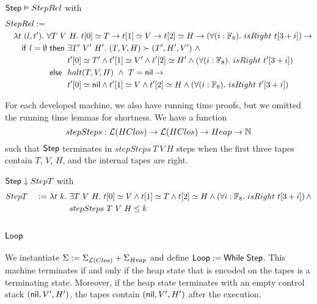 \begin{lemma}
  \label{lem:Step_Realise}
  $\mathsf{Step} \mathrel{\vDash} StepRel$ with
  \begin{alignat*}{1}
    & StepRel := \\
    &\quad \lambda t~(l, t').~\forall T~V~H.~ t[0] \simeq T \rightarrow t[1] \simeq V \rightarrow t[2] \simeq H \rightarrow \left(\forall (i:\Fin_8).~isRight~t[3+i]\right) \rightarrow \\
    &\qquad \MS{if}~l=\None~\pthen~\exists T'~V'~H'.~(T,V,H) \red (T',H',V') ~\land~ \\
    &\qquad \phantom{\MS{if}~l=\None~\pthen}~ t'[0] \simeq T' \land t'[1] \simeq V' \land t'[2] \simeq H' \land \left(\forall (i:\Fin_8).~isRight~t'[3+i]\right) \\
    &\qquad \phantom{\MS{if}~l=\None}~\pelse~ halt(T,V,H) ~\land~ T=\nil \rightarrow \\
    &\qquad \phantom{\MS{if}~l=\None~\pelse}~t'[0] \simeq \nil \land t'[1] \simeq V \land t'[2] \simeq H \land \left(\forall (i:\Fin_8).~isRight~t'[3+i]\right)
  \end{alignat*}
\end{lemma}

For each developed machine, we also have running time proofs, but we omitted the running time lemmas for shortness.  We have a function
\[
  stepSteps : \mathcal{L}(HClos) \rightarrow \mathcal{L}(HClos) \rightarrow Heap \rightarrow \mathbb{N}
\]
such that $\mathsf{Step}$ terminates in $stepSteps~T~V~H$ steps when the first three tapes contain $T$, $V$, $H$, and the internal tapes are right.
\begin{lemma}
  \label{lem:Step_Terminates}
  $\mathsf{Step} \mathrel{\downarrow} StepT$ with
  \begin{alignat*}{3}
    & StepT &~:=~& \lambda t~k.~\exists T~V~H.~t[0] \simeq V \land t[1] \simeq T \land t[2] \simeq H \land \left(\forall i:\mathbb{F}_8.~isRight~t[3+i]\right) \land \\
    &       &    & \phantom{\lambda t~k.}~stepSteps~T~V~H \leq k
  \end{alignat*}
\end{lemma}


\subsection{$\mathsf{Loop}$}
\label{sec:heap-Loop}
%

We instantiate $\Sigma := \Sigma_{\mathcal{L}(Clos)} + \Sigma_{Heap}$ and define $\mathsf{Loop} := \mathsf{While}~\mathsf{Step}$.  This machine terminates if and only if
the heap state that is encoded on the tapes is a terminating state.  Moreover, if the heap state terminates with an empty control stack
$(\mathsf{nil}, V', H')$, the tapes contain $(\mathsf{nil}, V', H')$ after the execution.

